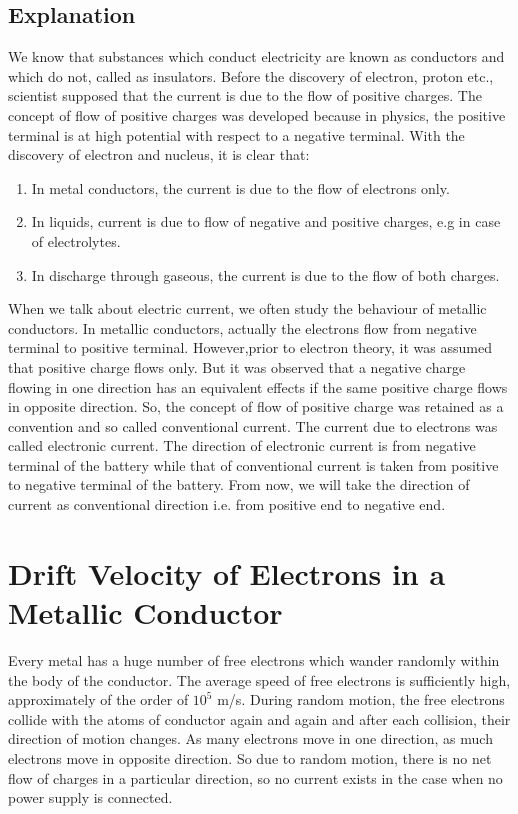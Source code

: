 \subsection*{Explanation}
We know that substances which conduct electricity are known as conductors and which do not, called as insulators. Before the discovery of electron, proton etc., scientist supposed that the current is due to the flow of positive charges. The concept of flow of positive charges was developed because in physics, the positive terminal is at high potential with respect to a negative terminal. With the discovery of electron and nucleus, it is clear that:
\begin{enumerate}[label = (\roman*)]
    \item In metal conductors, the current is due to the flow of electrons only.
    \item In liquids, current is due to flow of negative and positive charges, e.g in case of electrolytes.
    \item In discharge through gaseous, the current is due to the flow of both charges.
\end{enumerate}
When we talk about electric current, we often study the behaviour of metallic conductors. In metallic conductors, actually the electrons flow from negative terminal to positive terminal. However,prior to electron theory, it was assumed that positive charge flows only. But it was observed that a negative charge flowing in one direction has an equivalent effects if the same positive charge flows in opposite direction. So, the concept of flow of positive charge was retained as a convention and so called conventional current. The current due to electrons was called electronic current. The direction of electronic current is from negative terminal of the battery while that of conventional current is taken from positive to negative terminal of the battery.
From now, we will take the direction of current as conventional direction 
i.e. from positive end to negative end.
\section{Drift Velocity of Electrons in a Metallic Conductor}
Every metal has a huge number of free electrons which wander randomly within the body of the conductor. The average speed of free electrons is sufficiently high, approximately of the order of $10^{5}$ m/s. During random motion,
the free electrons collide with the atoms of conductor again and again and after each collision,  their direction of motion changes. As many electrons move in one direction, as much electrons move in opposite direction. So due to random motion, there is no net flow of charges  in a particular direction, so no current exists in the case when no power supply is connected.

